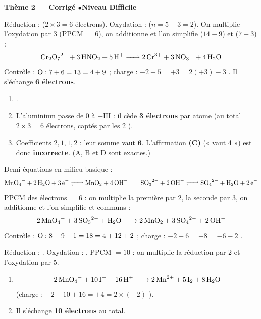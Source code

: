 \documentclass[11pt,a4paper]{article}
\begin{document}
\begin{center}\color{primarydark}\large\bfseries Thème 2 — Corrigé \quad$\bullet$\quad Niveau Difficile\end{center}

\begin{corrige}
Réduction :  ($2\times 3=6$ électrons).
Oxydation :  ($n=5-3=2$). On multiplie l'oxydation par 3
(PPCM $=6$), on additionne et l'on simplifie  ($14-9$) et  ($7-3$) :
\[
\ce{Cr2O7^{2-} + 3 HNO2 + 5 H+ -> 2 Cr^{3+} + 3 NO3^- + 4 H2O}
\]
Contrôle : $\ce{O}:7+6=13=4+9$ \checkmark ; charge : $-2+5=+3=2(+3)-3$ \checkmark. Il s'échange
\textbf{6 électrons}.
\end{corrige}

\begin{corrige}
\begin{enumerate}[label=\alph*)]
  \item {}.
  \item L'aluminium passe de $0$ à $+\mathrm{III}$ : il cède \textbf{3 électrons} par atome (au total
        $2\times 3=6$ électrons, captés par les 2 ).
  \item Coefficients $2,1,1,2$ : leur somme vaut $\mathbf{6}$. L'affirmation \textbf{(C)} (« vaut 4 »)
        est donc \textbf{incorrecte}. (A, B et D sont exactes.)
\end{enumerate}
\end{corrige}

\begin{corrige}
Demi-équations en milieu basique :
\[
\ce{MnO4^- + 2 H2O + 3 e^- <=> MnO2 + 4 OH^-}\qquad
\ce{SO3^{2-} + 2 OH^- <=> SO4^{2-} + H2O + 2 e^-}
\]
PPCM des électrons $=6$ : on multiplie la première par 2, la seconde par 3, on additionne et l'on
simplifie  et  communs :
\[
\ce{2 MnO4^- + 3 SO3^{2-} + H2O -> 2 MnO2 + 3 SO4^{2-} + 2 OH^-}
\]
Contrôle : $\ce{O}:8+9+1=18=4+12+2$ \checkmark ; charge : $-2-6=-8=-6-2$ \checkmark.
\end{corrige}

\begin{corrige}
Réduction : . Oxydation : .
PPCM $=10$ : on multiplie la réduction par 2 et l'oxydation par 5.
\begin{enumerate}[label=\alph*)]
  \item \[\ce{2 MnO4^- + 10 I^- + 16 H+ -> 2 Mn^{2+} + 5 I2 + 8 H2O}\]
        (charge : $-2-10+16=+4=2\times(+2)$ \checkmark).
  \item Il s'échange \textbf{10 électrons} au total.
\end{enumerate}
\end{corrige}
\end{document}
